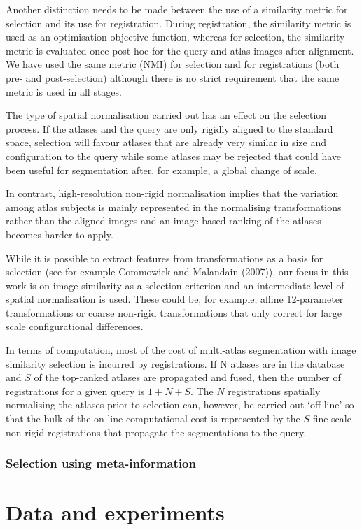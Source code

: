 Another distinction needs to be made between the use of a
similarity metric for selection and its use for registration. During
registration, the similarity metric is used as an optimisation objective
function, whereas for selection, the similarity metric is evaluated once
post hoc for the query and atlas images after alignment. We have used
the same metric (NMI) for selection and for registrations (both pre-
and post-selection) although there is no strict requirement that the
same metric is used in all stages.

The type of spatial normalisation carried out has an effect on the
selection process. If the atlases and the query are only rigidly aligned
to the standard space, selection will favour atlases that are already
very similar in size and configuration to the query while some atlases
may be rejected that could have been useful for segmentation after, for
example, a global change of scale.

In contrast, high-resolution non-rigid normalisation implies that
the variation among atlas subjects is mainly represented in the
normalising transformations rather than the aligned images and an
image-based ranking of the atlases becomes harder to apply.

While it is possible to extract features from transformations as a
basis for selection (see for example Commowick and Malandain
(2007)), our focus in this work is on image similarity as a selection
criterion and an intermediate level of spatial normalisation is used.
These could be, for example, affine 12-parameter transformations or
coarse non-rigid transformations that only correct for large scale
configurational differences.

In terms of computation, most of the cost of multi-atlas segmentation
with image similarity selection is incurred by registrations.
If N atlases are in the database and $S$ of the top-ranked atlases
are propagated and fused,
then the number of registrations for a given query is $1+N+S$.
The $N$ registrations spatially normalising the atlases prior to selection can,
however, be carried out `off-line' so that the bulk of
the on-line computational cost is represented by
the $S$ fine-scale non-rigid registrations
that propagate the segmentations to the query.

\subsubsection*{Selection using meta-information}
\section*{Data and experiments}
